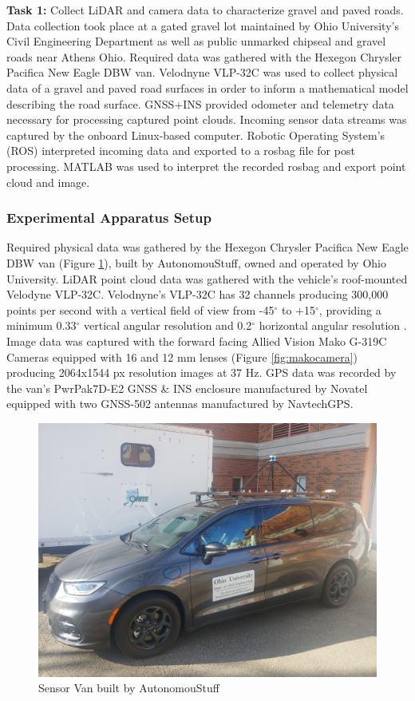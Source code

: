 \documentclass[numbered,pdftex]{ohio-etd}
\begin{document}
{{{			\textbf{Task 1: }{Collect LiDAR and camera data to characterize gravel and paved roads. Data collection took place at a gated gravel lot maintained by Ohio University's Civil Engineering Department as well as public unmarked chipseal and gravel roads near Athens Ohio. Required data was gathered with the Hexegon Chrysler Pacifica New Eagle DBW van. Velodnyne VLP-32C was used to collect physical data of a gravel and paved road surfaces in order to inform a mathematical model describing the road surface. GNSS+INS provided odometer and telemetry data necessary for processing captured point clouds. Incoming sensor data streams was captured by the onboard Linux-based computer. Robotic Operating System's (ROS) interpreted incoming data and exported to a rosbag file for post processing. MATLAB was used to interpret the recorded rosbag and export point cloud and image. }
	
			\subsubsection{Experimental Apparatus Setup}\label{sec:experimental-apparatus-setup}{
				
				{Required physical data was gathered by the Hexegon Chrysler Pacifica New Eagle DBW van (Figure \ref{fig:Experimental_Apperatus}), built by AutonomouStuff, owned and operated by Ohio University. LiDAR point cloud data was gathered with the vehicle's roof-mounted Velodyne VLP-32C. Velodnyne's VLP-32C has 32 channels producing 300,000 points per second with a vertical field of view from -45$^{\circ}$ to $+$15$^{\circ}$, providing a minimum 0.33$^{\circ}$ vertical angular resolution and 0.2$^{\circ}$ horizontal angular resolution \cite{vlp_32c}. Image data was captured with the forward facing Allied Vision Mako G-319C Cameras equipped with 16 and 12 mm lenses (Figure \ref{fig:makocamera}) producing 2064x1544 px resolution images at 37 Hz. GPS data was recorded by the van's PwrPak7D-E2 GNSS \& INS enclosure manufactured by Novatel equipped with two GNSS-502 antennas manufactured by NavtechGPS.}
				
				\begin{figure}[H]
					\centering
					\includegraphics[width=0.7\linewidth]{Defense_Images/van_on_van}
					\caption[Sensor Van]{Sensor Van built by AutonomouStuff}
					\label{fig:Experimental_Apperatus}
				\end{figure}
			
}}}}
\end{document}
